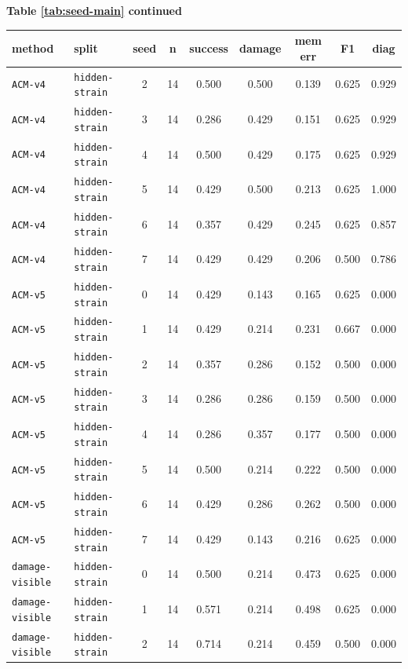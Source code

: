 \documentclass{article}
\begin{document}
\begin{center}
\textbf{Table \ref{tab:seed-main} continued}\\[0.4ex]
\begin{tabular}{llccccccc}
\toprule
method & split & seed & n & success & damage & mem err & F1 & diag \\
\midrule
\texttt{ACM-v4} & \texttt{hidden-strain} & 2 & 14 & 0.500 & 0.500 & 0.139 & 0.625 & 0.929 \\
\texttt{ACM-v4} & \texttt{hidden-strain} & 3 & 14 & 0.286 & 0.429 & 0.151 & 0.625 & 0.929 \\
\texttt{ACM-v4} & \texttt{hidden-strain} & 4 & 14 & 0.500 & 0.429 & 0.175 & 0.625 & 0.929 \\
\texttt{ACM-v4} & \texttt{hidden-strain} & 5 & 14 & 0.429 & 0.500 & 0.213 & 0.625 & 1.000 \\
\texttt{ACM-v4} & \texttt{hidden-strain} & 6 & 14 & 0.357 & 0.429 & 0.245 & 0.625 & 0.857 \\
\texttt{ACM-v4} & \texttt{hidden-strain} & 7 & 14 & 0.429 & 0.429 & 0.206 & 0.500 & 0.786 \\
\texttt{ACM-v5} & \texttt{hidden-strain} & 0 & 14 & 0.429 & 0.143 & 0.165 & 0.625 & 0.000 \\
\texttt{ACM-v5} & \texttt{hidden-strain} & 1 & 14 & 0.429 & 0.214 & 0.231 & 0.667 & 0.000 \\
\texttt{ACM-v5} & \texttt{hidden-strain} & 2 & 14 & 0.357 & 0.286 & 0.152 & 0.500 & 0.000 \\
\texttt{ACM-v5} & \texttt{hidden-strain} & 3 & 14 & 0.286 & 0.286 & 0.159 & 0.500 & 0.000 \\
\texttt{ACM-v5} & \texttt{hidden-strain} & 4 & 14 & 0.286 & 0.357 & 0.177 & 0.500 & 0.000 \\
\texttt{ACM-v5} & \texttt{hidden-strain} & 5 & 14 & 0.500 & 0.214 & 0.222 & 0.500 & 0.000 \\
\texttt{ACM-v5} & \texttt{hidden-strain} & 6 & 14 & 0.429 & 0.286 & 0.262 & 0.500 & 0.000 \\
\texttt{ACM-v5} & \texttt{hidden-strain} & 7 & 14 & 0.429 & 0.143 & 0.216 & 0.625 & 0.000 \\
\texttt{damage-visible} & \texttt{hidden-strain} & 0 & 14 & 0.500 & 0.214 & 0.473 & 0.625 & 0.000 \\
\texttt{damage-visible} & \texttt{hidden-strain} & 1 & 14 & 0.571 & 0.214 & 0.498 & 0.625 & 0.000 \\
\texttt{damage-visible} & \texttt{hidden-strain} & 2 & 14 & 0.714 & 0.214 & 0.459 & 0.500 & 0.000 \\

\end{tabular}
\end{center}
\end{document}
